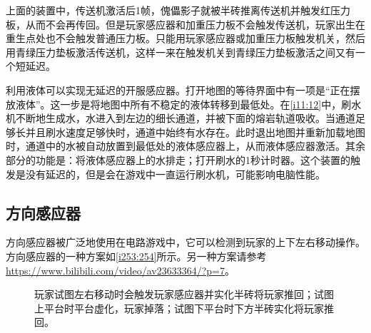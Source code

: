 上面的装置中，传送机激活后1帧，傀儡影子就被半砖推离传送机并触发红压力板，从而不会再传回。但是玩家感应器和加重压力板不会触发传送机，玩家出生在重生点处也不会触发普通压力板。只能用玩家感应器或加重压力板触发机关，然后用青绿压力垫板激活传送机，这样一来在触发机关到青绿压力垫板激活之间又有一个短延迟。

利用液体可以实现无延迟的开服感应器。打开地图的等待界面中有一项是“正在摆放液体”。这一步是将地图中所有不稳定的液体转移到最低处。在\autoref{i11:12}中，刷水机不断地生成水，水进入到左边的细长通道，并被下面的熔岩轨道吸收。当通道足够长并且刷水速度足够快时，通道中始终有水存在。此时退出地图并重新加载地图时，通道中的水被自动放置到最低处的液体感应器上，从而液体感应器激活。其余部分的功能是：将液体感应器上的水排走；打开刷水的1秒计时器。这个装置的触发是没有延迟的，但是会在游戏中一直运行刷水机，可能影响电脑性能。

\subsection{方向感应器}
方向感应器被广泛地使用在电路游戏中，它可以检测到玩家的上下左右移动操作。方向感应器的一种方案如\autoref{i253:254}所示。另一种方案请参考\url{https://www.bilibili.com/video/av23633364/?p=7}。

\begin{figure}[!ht]
\begin{center}
\qquad
{}
\end{center}
\caption{玩家试图左右移动时会触发玩家感应器并实化半砖将玩家推回；试图上平台时平台虚化，玩家掉落；试图下平台时下方半砖实化将玩家推回。}
\label{i253:254}
\end{figure}

